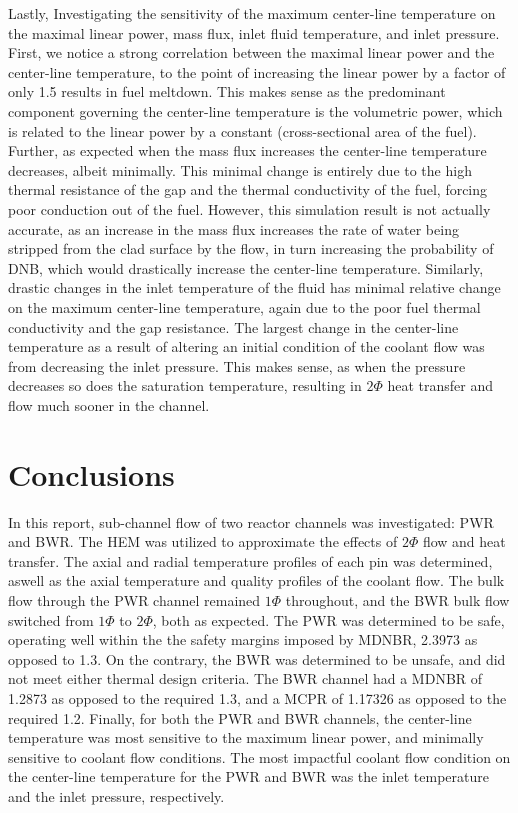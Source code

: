 \documentclass{article}
\begin{document}
Lastly, Investigating the sensitivity of the maximum center-line temperature on the maximal linear power, mass flux, inlet fluid temperature, and inlet pressure. First, we notice a strong correlation between the maximal linear power and the center-line temperature, to the point of increasing the linear power by a factor of only 1.5 results in fuel meltdown. This makes sense as the predominant component governing the center-line temperature is the volumetric power, which is related to the linear power by a constant (cross-sectional area of the fuel). Further, as expected when the mass flux increases  the center-line temperature decreases, albeit minimally. This minimal change is entirely due to the high thermal resistance of the gap and the thermal conductivity of the fuel, forcing poor conduction out of the fuel. However, this simulation result is not actually accurate, as an increase in the mass flux increases the rate of water being stripped from the clad surface by the flow, in turn increasing the probability of DNB, which would drastically increase the center-line temperature. Similarly, drastic changes in the inlet temperature of the fluid has minimal relative change on the maximum center-line temperature, again due to the poor fuel thermal conductivity and the gap resistance. The largest change in the center-line temperature as a result of altering an initial condition of the coolant flow was from decreasing the inlet pressure. This makes sense, as when the pressure decreases so does the saturation temperature, resulting in $2\Phi$ heat transfer and flow much sooner in the channel. 

\clearpage

\section{Conclusions}
In this report, sub-channel flow of two reactor channels was investigated: PWR and BWR. The HEM was utilized to approximate the effects of $2\Phi$ flow and heat transfer. The axial and radial temperature profiles of each pin was determined, aswell as the axial temperature and quality profiles of the coolant flow. The bulk flow through the PWR channel remained $1\Phi$ throughout, and the BWR bulk flow switched from $1\Phi$ to $2\Phi$, both as expected. The PWR was determined to be safe, operating well within the the safety margins imposed by MDNBR, 2.3973 as opposed to 1.3. On the contrary, the BWR was determined to be unsafe, and did not meet either thermal design criteria. The BWR channel had a MDNBR of 1.2873 as opposed to the required 1.3, and a MCPR of 1.17326 as opposed to the required 1.2. Finally, for both the PWR and BWR channels, the center-line temperature was most sensitive to the maximum linear power, and minimally sensitive to coolant flow conditions. The most impactful coolant flow condition on the center-line temperature for the PWR and BWR was the inlet temperature and the inlet pressure, respectively. 
\end{document}
